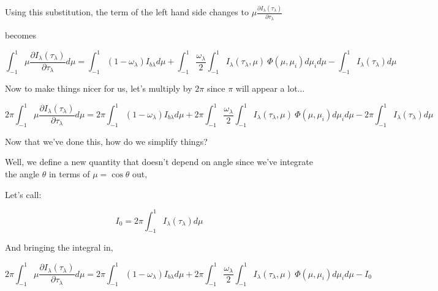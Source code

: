 \documentclass[12pt]{article}
\renewcommand{\_}{\kern-1.5pt\textunderscore\kern-1.5pt}
\begin{document}
\begin{itemize}
Using this substitution, the term of the left hand side changes to  \(  \mu  \frac{ \partial I_{ \lambda } \left(  \tau_{ \lambda } \right) }{ \partial  \tau_{ \lambda }} \) \par

becomes\par

 \[  \int _{-1}^{1} \mu \frac{ \partial I_{ \lambda } \left(  \tau_{ \lambda } \right) }{ \partial  \tau_{ \lambda }}d \mu = \int _{-1}^{1} \left( 1- \omega _{ \lambda } \right) I_{b \lambda } d \mu + \int _{-1}^{1}\frac{ \omega _{ \lambda }}{2} \int _{-1}^{1}I_{ \lambda } \left(  \tau_{ \lambda }, \mu  \right) ~ \Phi  \left(  \mu , \mu _{i} \right) d \mu _{i}d \mu - \int _{-1}^{1}I_{ \lambda } \left(  \tau_{ \lambda } \right) d \mu  \] \par

Now to make things nicer for us, let’s multiply by  \( 2 \pi  \)  since  \(  \pi  \)  will appear a lot$ \ldots $ \par

 \[ 2 \pi  \int _{-1}^{1} \mu \frac{ \partial I_{ \lambda } \left(  \tau_{ \lambda } \right) }{ \partial  \tau_{ \lambda }}d \mu =2 \pi  \int _{-1}^{1} \left( 1- \omega _{ \lambda } \right) I_{b \lambda } d \mu +2 \pi  \int _{-1}^{1}\frac{ \omega _{ \lambda }}{2} \int _{-1}^{1}I_{ \lambda } \left(  \tau_{ \lambda }, \mu  \right) ~ \Phi  \left(  \mu , \mu _{i} \right) d \mu _{i}d \mu -2 \pi  \int _{-1}^{1}I_{ \lambda } \left(  \tau_{ \lambda } \right) d \mu  \] \par

Now that we’ve done this, how do we simplify things?\par

Well, we define a new quantity that doesn’t depend on angle since we’ve integrate the angle  \(  \theta  \)  in terms of  \(  \mu =\cos  \theta  \)  out,\par

Let’s call:\par

 \[ I_{0}=2 \pi  \int _{-1}^{1}I_{ \lambda } \left(  \tau_{ \lambda } \right) d \mu  \] \par

And bringing the integral in,\par

 \[ 2 \pi  \int _{-1}^{1} \mu \frac{ \partial I_{ \lambda } \left(  \tau_{ \lambda } \right) }{ \partial  \tau_{ \lambda }}d \mu =2 \pi  \int _{-1}^{1} \left( 1- \omega _{ \lambda } \right) I_{b \lambda } d \mu +2 \pi  \int _{-1}^{1}\frac{ \omega _{ \lambda }}{2} \int _{-1}^{1}I_{ \lambda } \left(  \tau_{ \lambda }, \mu  \right) ~ \Phi  \left(  \mu , \mu _{i} \right) d \mu _{i}d \mu -I_{0} \] \par


\end{itemize}
\end{document}
